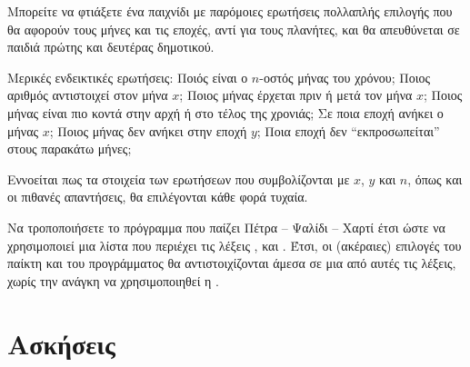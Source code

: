 \documentclass[a4paper,11pt,oneside]{book}
\begin{document}
\begin{exercise}
Μπορείτε να φτιάξετε ένα παιχνίδι με παρόμοιες ερωτήσεις πολλαπλής επιλογής που θα αφορούν τους μήνες και τις εποχές, αντί για τους πλανήτες, και θα απευθύνεται σε παιδιά πρώτης και δευτέρας δημοτικού.

\begin{note}
Mερικές ενδεικτικές ερωτήσεις: Ποιός είναι ο $n$-οστός μήνας του χρόνου; Ποιος αριθμός αντιστοιχεί στον μήνα $x$; Ποιος μήνας έρχεται πριν ή μετά τον μήνα $x$; Ποιος μήνας είναι πιο κοντά στην αρχή ή στο τέλος της χρονιάς; Σε ποια εποχή ανήκει ο μήνας $x$; Ποιος μήνας δεν ανήκει στην εποχή $y$; Ποια εποχή δεν ``εκπροσωπείται'' στους παρακάτω μήνες; 
\end{note}

Εννοείται πως τα στοιχεία των ερωτήσεων που συμβολίζονται με $x$, $y$ και $n$, όπως και οι πιθανές απαντήσεις, θα επιλέγονται κάθε φορά τυχαία.

\end{exercise}

\begin{exercise}
Να τροποποιήσετε το πρόγραμμα που παίζει Πέτρα -- Ψαλίδι -- Χαρτί έτσι ώστε να χρησιμοποιεί μια λίστα που περιέχει τις λέξεις ,  και .
Έτσι, οι (ακέραιες) επιλογές του παίκτη και του προγράμματος θα αντιστοιχίζονται άμεσα σε μια από αυτές τις λέξεις, χωρίς την ανάγκη να χρησιμοποιηθεί η .
\end{exercise}

\clearpage
\section{Ασκήσεις}
\end{document}
